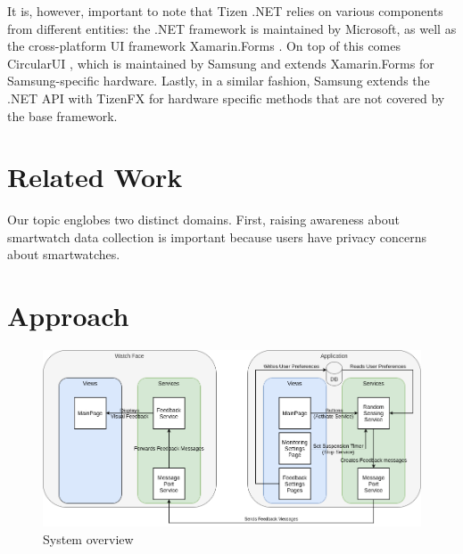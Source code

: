 \documentclass[conference, a4paper, 10pt, twocolumn]{IEEEtran}
\begin{document}
It is, however, important to note that Tizen .NET relies on various components from different entities: the .NET framework \cite{dotnet} is maintained by Microsoft, as well as the cross-platform UI framework Xamarin.Forms \cite{xamarin}. On top of this comes CircularUI \cite{circularUI}, which is maintained by Samsung and extends Xamarin.Forms for Samsung-specific hardware. Lastly, in a similar fashion, Samsung extends the .NET \ac{API} with TizenFX\cite{tizenFX} for hardware specific methods that are not covered by the base framework.

\section{Related Work}\label{related}
Our topic englobes two distinct domains. First, raising awareness about smartwatch data collection is important because users have privacy concerns about smartwatches.

\section{Approach}\label{approach}

\begin{figure}[ht]
\centerline{\includegraphics[width=1\textwidth]{img/appDiagram.png}}
\caption{System overview}
\label{systemOverview}
\end{figure}
\end{document}

